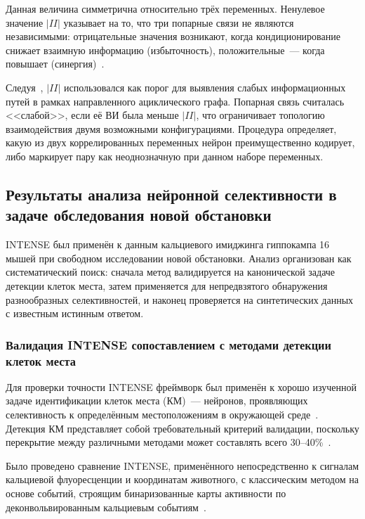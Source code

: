 Данная величина симметрична относительно трёх переменных. Ненулевое значение $|II|$ указывает на то, что три попарные связи не являются независимыми: отрицательные значения возникают, когда кондиционирование снижает взаимную информацию (избыточность), положительные~--- когда повышает (синергия)~\cite{Bell2003}.

Следуя~\cite{ghassami2017}, $|II|$ использовался как порог для выявления слабых информационных путей в рамках направленного ациклического графа. Попарная связь считалась <<слабой>>, если её ВИ была меньше $|II|$, что ограничивает топологию взаимодействия двумя возможными конфигурациями. Процедура определяет, какую из двух коррелированных переменных нейрон преимущественно кодирует, либо маркирует пару как неоднозначную при данном наборе переменных.


\subsection{Результаты анализа нейронной селективности в задаче обследования новой обстановки}\label{sec:intense_results}

INTENSE был применён к данным кальциевого имиджинга гиппокампа 16 мышей при свободном исследовании новой обстановки. Анализ организован как систематический поиск: сначала метод валидируется на канонической задаче детекции клеток места, затем применяется для непредвзятого обнаружения разнообразных селективностей, и наконец проверяется на синтетических данных с известным истинным ответом.

\subsubsection{Валидация INTENSE сопоставлением с методами детекции клеток места}

Для проверки точности INTENSE фреймворк был применён к хорошо изученной задаче идентификации клеток места (КМ)~--- нейронов, проявляющих селективность к определённым местоположениям в окружающей среде~\cite{o1971hippocampus}. Детекция КМ представляет собой требовательный критерий валидации, поскольку перекрытие между различными методами может составлять всего 30--40\%~\cite{Grijseels2021}.

Было проведено сравнение INTENSE, применённого непосредственно к сигналам кальциевой флуоресценции и координатам животного, с классическим методом на основе событий, строящим бинаризованные карты активности по деконвольвированным кальциевым событиям~\cite{skaggs1993information}.

